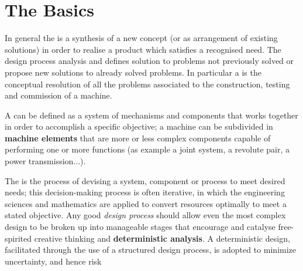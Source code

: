 \chapter{The Basics}
	In general the  is a synthesis of a new concept (or as arrangement of existing solutions) in order to realise a product which satisfies a recognised need. The design process analysis and defines solution to problems not previously solved or propose new solutions to already solved problems. In particular a  is the conceptual resolution of all the problems associated to the construction, testing and commission of a machine.
	
	A  can be defined as a system of mechanisms and components that works together in order to accomplish a specific objective; a machine can be subdivided in \textbf{machine elements} that are more or less complex components capable of performing one or more functions (as example a joint system, a revolute pair, a power transmission...).

	\vspace{3mm}
	The  is the process of devising a system, component or process to meet desired needs; this decision-making process is often iterative, in which the engineering sciences and mathematics are applied to convert resources optimally to meet a stated objective. Any good \textit{design process} should allow even the most complex design to be broken up into manageable stages that encourage and catalyse free-spirited creative thinking and \textbf{deterministic analysis}. A deterministic design, facilitated through the use of a structured design process, is adopted to minimize uncertainty, and hence risk
	

